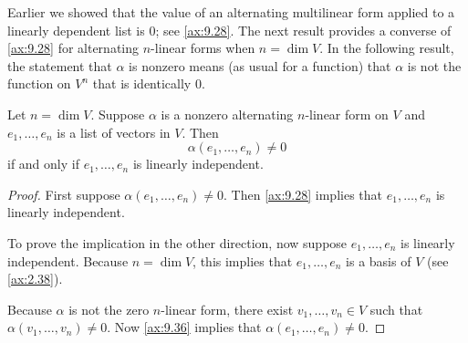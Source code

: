 %
Earlier we showed that the value of an alternating multilinear form applied to
a linearly dependent list is $0$; see \ref{ax:9.28}. The next result provides a
converse of \ref{ax:9.28} for alternating $n$-linear forms when $n=\dim V$. In
the following result, the statement that $\alpha$ is nonzero means (as usual
for a function) that $\alpha$ is not the function on $V^n$ that is
identically $0$.

\begin{result}\label{ax:9.39}
Let $n=\dim V$. Suppose $\alpha$ is a nonzero alternating $n$-linear form on
$V$ and $e_1,\dots,e_n$ is a list of vectors in $V$. Then
\[ \alpha(e_1,\dots,e_n)\ne0 \]
if and only if $e_1,\dots,e_n$ is linearly independent.
\end{result}

\begin{proof}
First suppose $\alpha(e_1,\dots,e_n)\ne0$. Then \ref{ax:9.28} implies that
$e_1,\dots,e_n$ is linearly independent.

To prove the implication in the other direction, now suppose $e_1,\dots,e_n$
is linearly independent. Because $n=\dim V$, this implies that
$e_1,\dots,e_n$ is a basis of $V$ (see \ref{ax:2.38}).

Because $\alpha$ is not the zero $n$-linear form, there exist
$v_1,\dots,v_n\in V$ such that $\alpha(v_1,\dots,v_n)\ne0$. Now \ref{ax:9.36}
implies that $\alpha(e_1,\dots,e_n)\ne0$.
\end{proof}

